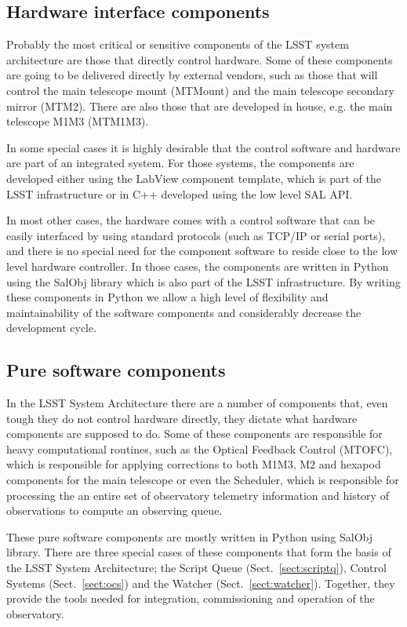 \subsection{Hardware interface components}\label{sect:hardware_csc}
Probably the most critical or sensitive components of the LSST system architecture are those that directly control hardware. Some of these components are going to be delivered directly by external vendors, such as those that will control the main telescope mount (MTMount) and the main telescope secondary mirror (MTM2). There are also those that are developed in house, e.g. the main telescope M1M3 (MTM1M3).

In some special cases it is highly desirable that the control software and hardware are part of an integrated system. For those systems, the components are developed either using the LabView component template, which is part of the LSST infrastructure or in C++ developed using the low level SAL API.

In most other cases, the hardware comes with a control software that can be easily interfaced by using standard protocols (such as TCP/IP or serial ports), and there is no special need for the component software to reside close to the low level hardware controller. In those cases, the components are written in Python using the SalObj library which is also part of the LSST infrastructure. By writing these components in Python we allow a high level of flexibility and maintainability of the software components and considerably decrease the development cycle.

\subsection{Pure software components}\label{sect:software_csc}
In the LSST System Architecture there are a number of components that, even tough they do not control hardware directly, they dictate what hardware components are supposed to do. Some of these components are responsible for heavy computational routines, such as the Optical Feedback Control (MTOFC), which is responsible for applying corrections to both M1M3, M2 and hexapod components for the main telescope or even the Scheduler, which is responsible for processing the an entire set of observatory telemetry information and history of observations to compute an observing queue.

These pure software components are mostly written in Python using SalObj library. There are three special cases of these components that form the basis of the LSST System Architecture; the Script Queue (Sect.~\ref{sect:scriptq}), Control Systems (Sect.~\ref{sect:ocs}) and the Watcher (Sect.~\ref{sect:watcher}). Together, they provide the tools needed for integration, commissioning and operation of the observatory.

